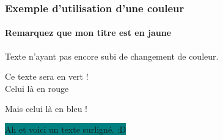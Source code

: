 \documentclass{beamer}
\begin{document}

\begin{frame}
\frametitle{\textcolor{titre}{Exemple d'utilisation d'une couleur}}
\framesubtitle{Remarquez que mon titre est en jaune}


Texte n'ayant pas encore subi de changement de couleur.\\

\color{blue}

\textcolor{vertmoyen}{Ce texte sera en vert !\\}
\textcolor{rouge}{Celui là en rouge\\}
	
Mais celui là en bleu !
	
\begin{center}
\colorbox{teal}{\textcolor[HTML]{FFFFFF}{Ah et voici un texte surligné. :D}}
\end{center}

\end{frame}
\end{document}
